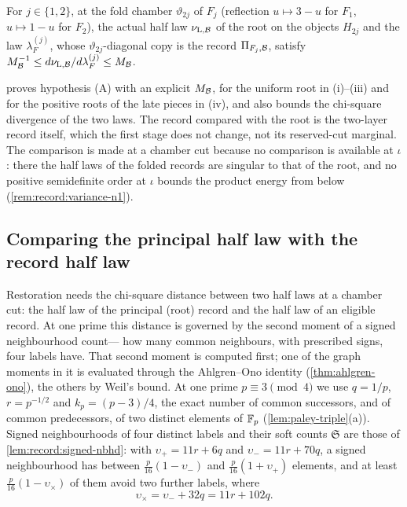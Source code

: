 \begin{hypothesis}\label{hyp:variance:A}
For $j\in\{1,2\}$, at the fold chamber $\vartheta_{2j}$ of $F_j$ (reflection
$u\mapsto3-u$ for $F_1$, $u\mapsto1-u$ for $F_2$), the actual half law
$\nu_{\mathrm L,\mathcal B}$ of the root on the objects $H_{2j}$ and the law
$\lambda_F^{(j)}$, whose $\vartheta_{2j}$-diagonal copy is the record
$\Pi_{F_j,\mathcal B}$, satisfy $M_\mathcal B^{-1}\le d\nu_{\mathrm L,\mathcal B}/d\lambda_F^{(j)}
\le M_\mathcal B$.
\end{hypothesis}

 proves hypothesis (A) with an explicit
$M_\mathcal B$, for the uniform root in (i)--(iii) and for the positive roots of the
late pieces in (iv), and also bounds the chi-square divergence of the two laws.
The record compared with the root is the two-layer record itself, which the
first stage does not change, not its reserved-cut marginal. The
comparison is made at a chamber cut because no comparison is available at
$\iota$: there the half laws of the folded records are singular to that of the
root, and no positive semidefinite order at $\iota$ bounds the product energy
from below (\cref{rem:record:variance-n1}).

\subsection{Comparing the principal half law with the record half law}\label{subsec:variance:root}

Restoration needs the chi-square distance between two half laws
at a chamber cut: the half law of the principal (root) record and
the half law of an eligible record. At one prime this distance is
governed by the second moment of a signed neighbourhood count---
how many common neighbours, with prescribed signs, four labels
have. That second moment is computed first; one of the graph
moments in it is evaluated through the Ahlgren--Ono identity
(\cref{thm:ahlgren-ono}), the others by Weil's bound. At one prime $p\equiv3\pmod4$ we use $q=1/p$, $r=p^{-1/2}$ and $k_p=(p-3)/4$,
the exact number of common successors, and of common predecessors, of two
distinct elements of $\mathbb F_p$ (\cref{lem:paley-triple}(a)). Signed
neighbourhoods of four distinct labels and their soft counts $\mathfrak S$ are
those of \cref{lem:record:signed-nbhd}: with $\upsilon_+=11r+6q$ and
$\upsilon_-=11r+70q$, a signed neighbourhood has between
$\frac p{16}(1-\upsilon_-)$ and $\frac p{16}(1+\upsilon_+)$ elements, and at
least $\frac p{16}(1-\upsilon_\times)$ of them avoid two further labels, where
\[
 \upsilon_\times=\upsilon_-+32q=11r+102q .
\]

